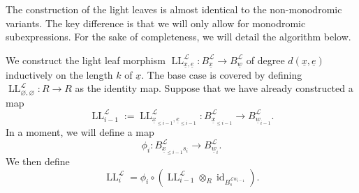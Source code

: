 \documentclass{amsart}
\newcommand{\scrL}{\mathcal{L}}
\DeclareMathOperator{\id}{id}
\DeclareMathOperator{\LL}{LL}
\newcommand{\ue}{\underline{e}}
\newcommand{\uw}{\underline{w}}
\newcommand{\ux}{\underline{x}}
\renewcommand{\emptyset}{\varnothing}
\theoremstyle{definition}
\numberwithin{equation}{subsection}
\begin{document}
The construction of the light leaves is almost identical to the non-monodromic variants.
The key difference is that we will only allow for monodromic subexpressions.
For the sake of completeness, we will detail the algorithm below.

We construct the light leaf morphism $\LL_{\ux, \ue}^{\scrL} : B_{\ux}^{\scrL} \to B_{\uw}^{\scrL}$ of degree $d(\ux,\ue)$ inductively on the length $k$ of $\ux$.
The base case is covered by defining $\LL_{\emptyset, \emptyset}^{\scrL} : R \to R$ as the identity map. 
Suppose that we have already constructed a map 
\[\LL_{i-1}^{\scrL} := \LL_{\ux_{\leq i-1}, \ue_{\leq i-1}}^{\scrL} : B_{\ux_{\leq i-1}}^{\scrL} \to B_{\uw_{i-1}}^{\scrL}.\]
In a moment, we will define a map 
\[\phi_i : B_{\ux_{\leq i-1} s_i}^{\scrL} \to B_{\uw_{i}}^{\scrL}.\] 
We then define 
\[\LL_i^{\scrL} = \phi_i \circ ( \LL_{i-1}^{\scrL} \otimes_R \id_{B_s^{\scrL w_{i-1}}}).\]
\end{document}
